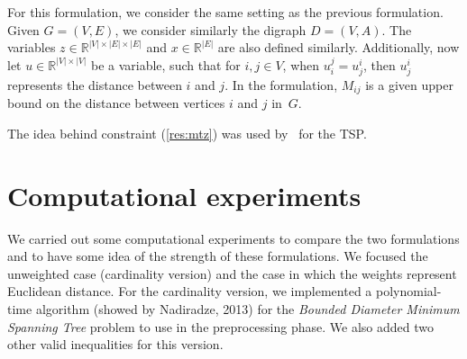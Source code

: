 \documentclass[12pt]{article}
\newcommand{\espacoX}{\mathbb{R}^{|E|}}
\newcommand{\espacoZ}{\mathbb{R}^{|V| \times |E| \times |E|}}
\newcommand{\espacoU}{\mathbb{R}^{|V| \times |V|}}
\newcommand{\espacoUuni}{\mathbb{R}^{|V|}}
\newcommand{\espacoXBinary}{\mathbb{B}^{|E|}}
\newcommand{\espacoYBinary}{\mathbb{B}^{|E| \times |E|}}
\begin{document}
  For this formulation, we consider the same setting as the previous
  formulation. Given $G = (V,E)$, we consider similarly the digraph
  $D = (V,A)$.  The variables $z \in \espacoZ$ and $x \in \espacoX$
  are also defined similarly. Additionally, now let $u \in \espacoU$
  be a variable, such that for $i,j \in V$, when $u^{j}_{i} = u^{i}_{j}$, then
  $u^{i}_{j}$ represents the distance between $i$ and $j$. In the formulation,
  $M_{ij}$ is a given upper bound on the distance between vertices $i$
  and $j$ in~$G$.
%
  \begin{lpformulation} %
    \lpeq[]{x \in \espacoXBinary, z^{r} \in \espacoYBinary, u^{r} \in \espacoUuni}{r \in V}
\end{lpformulation}

The idea behind constraint (\ref{res:mtz}) was used by~\cite{MillerTZ60} for the TSP.

\section{Computational experiments}

We carried out some computational experiments to compare the two
formulations and to have some idea of the strength of these
formulations.  We focused the unweighted case (cardinality version)
and the case in which the weights represent Euclidean distance. For
the cardinality version, we implemented a polynomial-time algorithm
(showed by Nadiradze, 2013) for the \emph{Bounded Diameter Minimum
  Spanning Tree} problem to use in the preprocessing phase. We also
added two other valid inequalities for this version.
\end{document}

